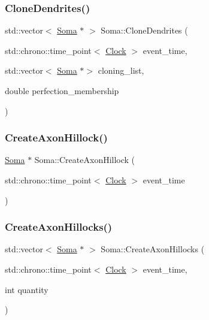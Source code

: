 \mbox{\label{classSoma_a3975212d2e3d8675ca14fbc9879e5e54}} 
\subsubsection{\texorpdfstring{Clone\+Dendrites()}{CloneDendrites()}}
{\footnotesize\ttfamily std\+::vector$<$ \mbox{\hyperlink{classSoma}{Soma}} $\ast$ $>$ Soma\+::\+Clone\+Dendrites (\begin{DoxyParamCaption}\item[{std\+::chrono\+::time\+\_\+point$<$ \mbox{\hyperlink{universe_8h_a0ef8d951d1ca5ab3cfaf7ab4c7a6fd80}{Clock}} $>$}]{event\+\_\+time,  }\item[{std\+::vector$<$ \mbox{\hyperlink{classSoma}{Soma}} $\ast$$>$}]{cloning\+\_\+list,  }\item[{double}]{perfection\+\_\+membership }\end{DoxyParamCaption})}

\mbox{\label{classSoma_a42289635de3cb326bceeb5358b99c190}} 
\subsubsection{\texorpdfstring{Create\+Axon\+Hillock()}{CreateAxonHillock()}}
{\footnotesize\ttfamily \mbox{\hyperlink{classSoma}{Soma}} $\ast$ Soma\+::\+Create\+Axon\+Hillock (\begin{DoxyParamCaption}\item[{std\+::chrono\+::time\+\_\+point$<$ \mbox{\hyperlink{universe_8h_a0ef8d951d1ca5ab3cfaf7ab4c7a6fd80}{Clock}} $>$}]{event\+\_\+time }\end{DoxyParamCaption})}

\mbox{\label{classSoma_ab059a6d4a7dc41664d6d17794d09b260}} 
\subsubsection{\texorpdfstring{Create\+Axon\+Hillocks()}{CreateAxonHillocks()}}
{\footnotesize\ttfamily std\+::vector$<$ \mbox{\hyperlink{classSoma}{Soma}} $\ast$ $>$ Soma\+::\+Create\+Axon\+Hillocks (\begin{DoxyParamCaption}\item[{std\+::chrono\+::time\+\_\+point$<$ \mbox{\hyperlink{universe_8h_a0ef8d951d1ca5ab3cfaf7ab4c7a6fd80}{Clock}} $>$}]{event\+\_\+time,  }\item[{int}]{quantity }\end{DoxyParamCaption})}

